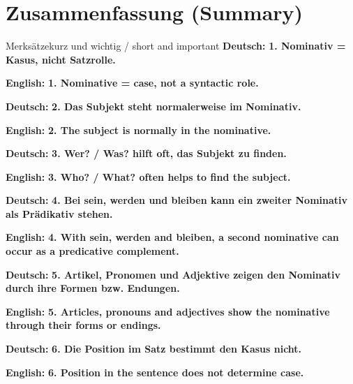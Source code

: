 \documentclass[a4paper,11pt]{article}
\newcommand{\GermanText}[1]{\textbf{Deutsch: }#1\par}
\newcommand{\EnglishText}[1]{{\small\color{SoftGray}\textbf{English: }#1\par}}
\begin{document}
\section{Zusammenfassung \textnormal{(Summary)}}

\begin{grammarentry}{Merksätze}{kurz und wichtig / short and important}
\GermanText{\textbf{1. Nominativ = Kasus, nicht Satzrolle.}}
\EnglishText{\textbf{1. Nominative = case, not a syntactic role.}}

\GermanText{\textbf{2. Das Subjekt steht normalerweise im Nominativ.}}
\EnglishText{\textbf{2. The subject is normally in the nominative.}}

\GermanText{\textbf{3. Wer? / Was? hilft oft, das Subjekt zu finden.}}
\EnglishText{\textbf{3. Who? / What? often helps to find the subject.}}

\GermanText{\textbf{4. Bei sein, werden und bleiben kann ein zweiter Nominativ als Prädikativ stehen.}}
\EnglishText{\textbf{4. With sein, werden and bleiben, a second nominative can occur as a predicative complement.}}

\GermanText{\textbf{5. Artikel, Pronomen und Adjektive zeigen den Nominativ durch ihre Formen bzw. Endungen.}}
\EnglishText{\textbf{5. Articles, pronouns and adjectives show the nominative through their forms or endings.}}

\GermanText{\textbf{6. Die Position im Satz bestimmt den Kasus nicht.}}
\EnglishText{\textbf{6. Position in the sentence does not determine case.}}
\end{grammarentry}
\end{document}
